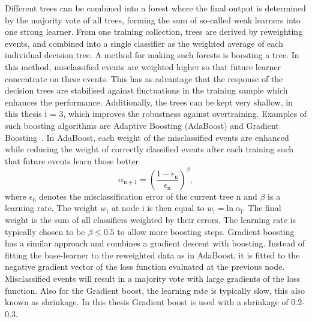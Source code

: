  Different trees can be combined into a forest where the final output is determined by the majority vote of all trees, forming the sum of so-called weak learners into one strong learner.   From one training collection, trees are derived by reweighting events, and combined into a single classifier as the  weighted average of each individual decision tree. A method for  making such forests is  boosting a tree. In this method, misclassified events are weighted higher so that future learner concentrate on these events. This has as advantage that the response of the decision trees are stabilised against fluctuations in the training sample which enhances the performance. Additionally, the trees can be kept very shallow, in this thesis i = 3, which improves the robustness against overtraining. Examples of such boosting algorithms are Adaptive Boosting (AdaBoost) and Gradient Boosting~\cite{2014arXiv1403.1452M}. In AdaBoost, each weight of the misclassified events are enhanced while reducing the weight of correctly classified events after each training such that  future events learn those better
\begin{equation}
 \alpha_{\mathrm{n+1}} = \left(\frac{1-\epsilon_{\mathrm{n}}}{\epsilon_{\mathrm{n}}}\right)^{\beta}, 
\end{equation}
where $\epsilon_{\mathrm{n}}$ denotes the misclassification error of the current tree n and $\beta$ is a learning rate. The weight $w_{\mathrm{i}}$ at node i is then equal to $w_{\mathrm{i}} = \mathrm{ln}\:\alpha_{\mathrm{i}}$. The final weight is the sum of all classifiers weighted by their errors. The learning rate is typically chosen to be $\beta\leqslant 0.5$ to allow more boosting steps. Gradient boosting has a similar approach and combines a gradient descent with boosting. Instead of fitting the base-learner to the reweighted data as in AdaBoost, it is fitted to the negative gradient vector of the loss function evaluated at the previous node. Misclassified events will result in a majority vote with large gradients of the loss function. Also for the Gradient boost, the learning rate is typically slow, this also known as shrinkage. In this thesis Gradient boost is used with a shrinkage of 0.2-0.3.

